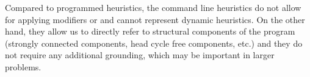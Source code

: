 Compared to programmed heuristics, 
the command line heuristics do not allow for applying modifiers  or  
and cannot represent dynamic heuristics.
On the other hand, they allow us to directly refer to structural components of the program 
(strongly connected components, head cycle free components, etc.)
and they do not require any additional grounding, 
which may be important in larger problems.


